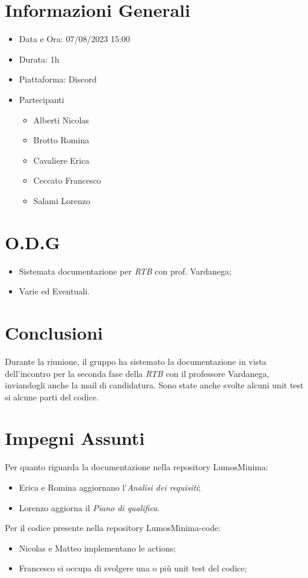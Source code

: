 \documentclass[a4paper, 12pt]{article}
\begin{document}
\makefrontpage

\section*{Informazioni Generali}
\begin{itemize}
    \item Data e Ora: 07/08/2023 15:00
    \item Durata: 1h
    \item Piattaforma: Discord
    \item Partecipanti
    \begin{itemize}
        \item Alberti Nicolas
        \item Brotto Romina
        \item Cavaliere Erica
        \item Ceccato Francesco
        \item Salami Lorenzo
    \end{itemize}
\end{itemize}

\section*{O.D.G}
\begin{itemize}
    \item Sistemata documentazione per \textit{RTB} con prof. Vardanega;
    \item Varie ed Eventuali.
\end{itemize}

\section*{Conclusioni}
Durante la riunione, il gruppo ha sistemato la documentazione in vista dell'incontro per la seconda fase della \textit{RTB} con il professore Vardanega, inviandogli anche la mail di candidatura.\newline
Sono state anche svolte alcuni unit test si alcune parti del codice.

\section*{Impegni Assunti}

Per quanto riguarda la documentazione nella repository LumosMinima:
\begin{itemize}
    \item Erica e Romina aggiornano l'\textit{Analisi dei requisiti};
    \item Lorenzo aggiorna il \textit{Piano di qualifica}.
\end{itemize}

Per il codice presente nella repository LumosMinima-code:
\begin{itemize}
    \item Nicolas e Matteo implementano le actions;
    \item Francesco si occupa di svolgere una o più unit test del codice;
\end{itemize}
\end{document}
